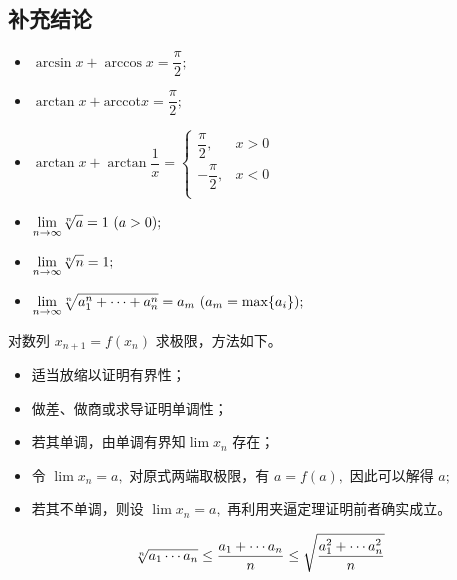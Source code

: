 \begin{Appendices}

\chapter{补充结论}


\begin{itemize}
    \item $ \arcsin x + \arccos x = \dfrac{\pi}{2}; $ 
    \item $ \arctan x + \textrm{arccot} x = \dfrac{\pi}{2}; $ 
    \item $ \arctan x + \arctan \dfrac{1}{x} = \begin{cases}
        \dfrac{\pi}{2},& x>0\\
        -\dfrac{\pi}{2},& x<0\\
    \end{cases} $ 
\end{itemize}


\begin{itemize}
    \item $ {\displaystyle\lim_{n\rightarrow \infty}}\displaystyle\sqrt[n]a = 1\ (a > 0); $ 
    \item $ {\displaystyle\lim_{n\rightarrow \infty}}\displaystyle\sqrt[n]n = 1; $ 
    \item $ {\displaystyle\lim_{n\rightarrow \infty}}\displaystyle\sqrt[n]{a_1^n+\cdots+a_n^n} = a_m\ (a_m = \max\{a_i\}); $ 
\end{itemize}


对数列 $ x_{n+1} = f(x_n) $ 求极限，方法如下。
\begin{itemize}
    \item 适当放缩以证明有界性；
    \item 做差、做商或求导证明单调性；
    \item 若其单调，由单调有界知$ \lim x_n $ 存在；
    \item 令 $ \lim x_n = a, $ 对原式两端取极限，有 $ a = f(a), $ 因此可以解得 $ a; $ 
    \item 若其不单调，则设 $ \lim x_n = a, $ 再利用夹逼定理证明前者确实成立。
\end{itemize}


\begin{equation*}
    \begin{aligned}
        \sqrt[n]{a_1\cdots a_n}\leq \dfrac{a_1+\cdots a_n}{n}\leq \displaystyle\sqrt{\dfrac{a_1^2+\cdots a_n^2}{n}}
    \end{aligned}
\end{equation*}


\end{Appendices}
